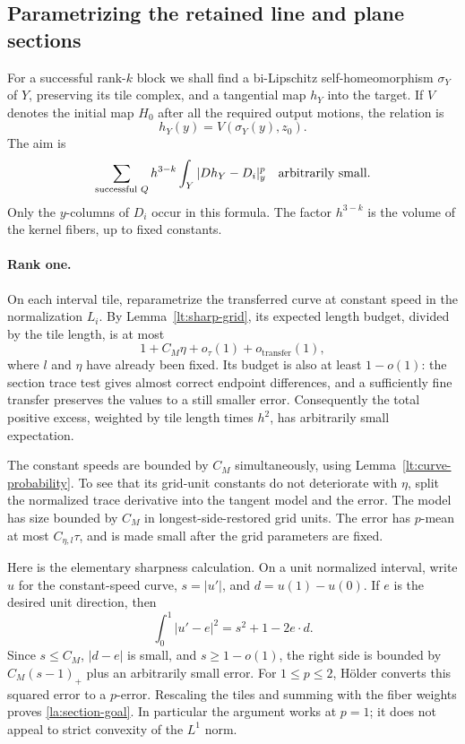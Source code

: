 \documentclass[11pt]{article}
\numberwithin{equation}{section}
\theoremstyle{definition}
\theoremstyle{remark}
\begin{document}
\subsection{Parametrizing the retained line and plane sections}

For a successful rank-$k$ block we shall find a bi-Lipschitz
self-homeomorphism $\sigma_Y$ of $Y$, preserving its tile complex,
and a tangential map $h_Y$ into the target.  If $V$ denotes the initial
map $H_0$ after all the required output motions, the relation is
\begin{equation}\label{la:section-parametrization}
 h_Y(y)=V(\sigma_Y(y),z_0).
\end{equation}
The aim is
\begin{equation}\label{la:section-goal}
 \sum_{\text{successful }Q}
   h^{3-k}\int_Y |Dh_Y-D_i|_y^p
       \quad\hbox{arbitrarily small}.
\end{equation}
Only the $y$-columns of $D_i$ occur in this formula.  The factor
$h^{3-k}$ is the volume of the kernel fibers, up to fixed constants.

\paragraph{Rank one.}
On each interval tile, reparametrize the transferred curve at
constant speed in the normalization $L_i$.  By
Lemma~\ref{lt:sharp-grid}, its expected length budget, divided by
the tile length, is at most
\begin{equation}\label{la:sharp-length-budget}
 1+C_M\eta+o_{\tau}(1)+o_{\mathrm{transfer}}(1),
\end{equation}
where $l$ and $\eta$ have already been fixed.  Its budget is also at
least $1-o(1)$: the section trace test gives almost correct endpoint
differences, and a sufficiently fine transfer preserves the values
to a still smaller error.  Consequently the total positive excess,
weighted by tile length times $h^2$, has arbitrarily small expectation.

The constant speeds are bounded by $C_M$ simultaneously, using
Lemma~\ref{lt:curve-probability}.  To see that its grid-unit constants
do not deteriorate with $\eta$, split the normalized trace derivative
into the tangent model and the error.  The model has size bounded by
$C_M$ in longest-side-restored grid units.  The error has $p$-mean at
most $C_{\eta,l}\tau$, and is made small after the grid parameters
are fixed.

Here is the elementary sharpness calculation.  On a unit normalized
interval, write $u$ for the constant-speed curve, $s=|u'|$, and
$d=u(1)-u(0)$.  If $e$ is the desired unit direction, then
\begin{equation}\label{la:length-sharpness}
 \int_0^1|u'-e|^2=s^2+1-2e\cdot d.
\end{equation}
Since $s\le C_M$, $|d-e|$ is small, and $s\ge1-o(1)$, the right side
is bounded by $C_M(s-1)_+$ plus an arbitrarily small error.
For $1\le p\le2$, H\"older converts this squared error to a
$p$-error.  Rescaling the tiles and summing with the fiber weights
proves \eqref{la:section-goal}.  In particular the argument works at
$p=1$; it does not appeal to strict convexity of the $L^1$ norm.
\end{document}
